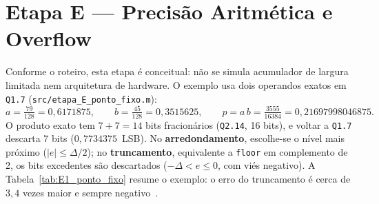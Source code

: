 \documentclass[11pt,a4paper]{article}
\newcommand{\MetricaEProdCompleto}{0{,}21697998046875}
\begin{document}
\FloatBarrier
\section{Etapa E — Precisão Aritmética e Overflow}

Conforme o roteiro, esta etapa é conceitual: não se simula acumulador de largura limitada nem arquitetura de hardware. O exemplo usa dois operandos exatos em \texttt{Q1.7} (\texttt{src/etapa\_E\_ponto\_fixo.m}):
\begin{equation}
    a = \tfrac{79}{128} = 0,6171875, \qquad b = \tfrac{45}{128} = 0,3515625, \qquad p = a\,b = \tfrac{3555}{16384} = \MetricaEProdCompleto .
\end{equation}
O produto exato tem $7 + 7 = 14$ bits fracionários (\texttt{Q2.14}, 16 bits), e voltar a \texttt{Q1.7} descarta 7 bits ($0,7734375$~LSB). No \textbf{arredondamento}, escolhe-se o nível mais próximo ($|e| \le \Delta/2$); no \textbf{truncamento}, equivalente a \texttt{floor} em complemento de 2, os bits excedentes são descartados ($-\Delta < e \le 0$, com viés negativo). A Tabela~\ref{tab:E1_ponto_fixo} resume o exemplo: o erro do truncamento é cerca de $3,4$ vezes maior e sempre negativo~\cite{aula17}.
\end{document}
